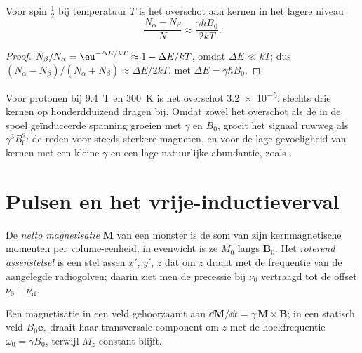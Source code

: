 \begin{proposition}\label{prop:b3:advanced-nmr:populations}
Voor spin $\frac12$ bij temperatuur $T$ is het overschot aan kernen in het
lagere niveau
\[
\frac{N_\alpha - N_\beta}{N} \approx \frac{\gamma\hbar B_0}{2kT}.
\]
\end{proposition}

\begin{proof}
$N_\beta/N_\alpha = \eu^{-\Delta E/kT} \approx 1 - \Delta E/kT$, omdat $\Delta E \ll kT$; dus
$(N_\alpha - N_\beta)/(N_\alpha + N_\beta) \approx \Delta E/2kT$, met $\Delta E = \gamma\hbar B_0$.
\end{proof}

Voor protonen bij \qty{9.4}{T} en \qty{300}{K} is het overschot \num{3.2e-5}:
slechts drie kernen op honderdduizend dragen bij. Omdat zowel het overschot
als de in de spoel geïnduceerde spanning groeien met $\gamma$ en $B_0$,
groeit het signaal ruwweg als $\gamma^3B_0^2$: de reden voor steeds sterkere
magneten, en voor de lage gevoeligheid van kernen met een kleine $\gamma$
en een lage natuurlijke abundantie, zoals
.

\section{Pulsen en het vrije-inductieverval}

\begin{definition}\label{def:b3:advanced-nmr:magnetisation}
De \emph{netto magnetisatie} $\mathbf M$ van een
monster is de som van zijn kernmagnetische momenten per volume-eenheid; in
evenwicht is ze
$M_0$ langs $\mathbf B_0$. Het \emph{roterend assenstelsel}
is een stel assen $x'$, $y'$, $z$ dat om $z$ draait met de frequentie van
de aangelegde radiogolven; daarin ziet men de precessie bij $\nu_0$
vertraagd tot de offset $\nu_0 -
\nu_{\mathrm{rf}}$.
\end{definition}

\begin{proposition}[Precessie]\label{prop:b3:advanced-nmr:precession}
Een magnetisatie in een veld gehoorzaamt aan $\dd\mathbf M/\dd t = \gamma\,\mathbf M\times\mathbf B$; in een
statisch veld $B_0\mathbf e_z$ draait haar transversale component om $z$
met de hoekfrequentie $\omega_0 = \gamma B_0$, terwijl $M_z$ constant blijft.
\end{proposition}

